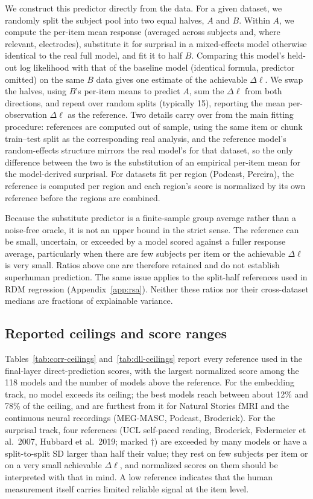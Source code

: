 We construct this predictor directly from the data. For a given dataset, we randomly split the subject pool into two equal halves, $A$ and $B$. Within $A$, we compute the per-item mean response (averaged across subjects and, where relevant, electrodes), substitute it for surprisal in a mixed-effects model otherwise identical to the real full model, and fit it to half $B$. Comparing this model's held-out log likelihood with that of the baseline model (identical formula, predictor omitted) on the same $B$ data gives one estimate of the achievable $\Delta\ell$. We swap the halves, using $B$'s per-item means to predict $A$, sum the $\Delta\ell$ from both directions, and repeat over random splits (typically 15), reporting the mean per-observation $\Delta\ell$ as the reference. Two details carry over from the main fitting procedure: references are computed out of sample, using the same item or chunk train--test split as the corresponding real analysis, and the reference model's random-effects structure mirrors the real model's for that dataset, so the only difference between the two is the substitution of an empirical per-item mean for the model-derived surprisal. For datasets fit per region (Podcast, Pereira), the reference is computed per region and each region's score is normalized by its own reference before the regions are combined.

Because the substitute predictor is a finite-sample group average rather than a noise-free oracle, it is not an upper bound in the strict sense. The reference can be small, uncertain, or exceeded by a model scored against a fuller response average, particularly when there are few subjects per item or the achievable $\Delta\ell$ is very small. Ratios above one are therefore retained and do not establish superhuman prediction. The same issue applies to the split-half references used in RDM regression (Appendix~\ref{app:rsa}). Neither these ratios nor their cross-dataset medians are fractions of explainable variance.

\subsection{Reported ceilings and score ranges}
\label{app:ceiling-values}

Tables~\ref{tab:corr-ceilings} and~\ref{tab:dll-ceilings} report every reference used in the final-layer direct-prediction scores, with the largest normalized score among the 118 models and the number of models above the reference. For the embedding track, no model exceeds its ceiling; the best models reach between about 12\% and 78\% of the ceiling, and are furthest from it for Natural Stories fMRI and the continuous neural recordings (MEG-MASC, Podcast, Broderick). For the surprisal track, four references (UCL self-paced reading, Broderick, Federmeier et al.\ 2007, Hubbard et al.\ 2019; marked $\dagger$) are exceeded by many models or have a split-to-split SD larger than half their value; they rest on few subjects per item or on a very small achievable $\Delta\ell$, and normalized scores on them should be interpreted with that in mind. A low reference indicates that the human measurement itself carries limited reliable signal at the item level.

